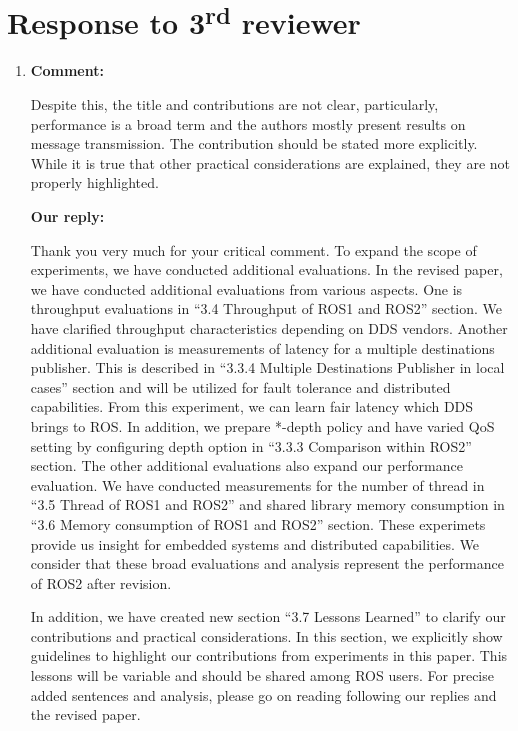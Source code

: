 \documentclass{article}
\newcommand\rd{\textsuperscript{rd}\xspace}
\begin{document}
\section{Response to 3\rd reviewer}
\begin{enumerate}

\item \begin{flushleft}
  \textbf{Comment:}
\end{flushleft}
  Despite this, the title and contributions are not clear, particularly, performance is a broad term and the authors mostly present results on message transmission. 
  The contribution should be stated more explicitly.
  While it is true that other practical considerations are explained, they are not properly highlighted.

  \begin{flushleft}
    \textbf{Our reply:}
  \end{flushleft}
  Thank you very much for your critical comment.
  To expand the scope of experiments, we have conducted additional evaluations.
  In the revised paper, we have conducted additional evaluations from various aspects.
  One is throughput evaluations in ``3.4 Throughput of ROS1 and ROS2'' section.
  We have clarified throughput characteristics depending on DDS vendors.
  Another additional evaluation is measurements of latency for a multiple destinations publisher.
  This is described in ``3.3.4 Multiple Destinations Publisher in local cases'' section and will be utilized for fault tolerance and distributed capabilities.
  From this experiment, we can learn fair latency which DDS brings to ROS.
  In addition, we prepare *-depth policy and have varied QoS setting by configuring depth option in ``3.3.3 Comparison within ROS2'' section.
  The other additional evaluations also expand our performance evaluation.
  We have conducted measurements for the number of thread in ``3.5 Thread of ROS1 and ROS2'' and shared library memory consumption in ``3.6 Memory consumption of ROS1 and ROS2'' section.
  These experimets provide us insight for embedded systems and distributed capabilities.
  We consider that these broad evaluations and analysis represent the performance of ROS2 after revision.
  
  In addition, we have created new section ``3.7 Lessons Learned'' to clarify our contributions and practical considerations.
  In this section, we explicitly show guidelines to highlight our contributions from experiments in this paper.
  This lessons will be variable and should be shared among ROS users.
  For precise added sentences and analysis, please go on reading following our replies and the revised paper.
  

\end{enumerate}
\end{document}
